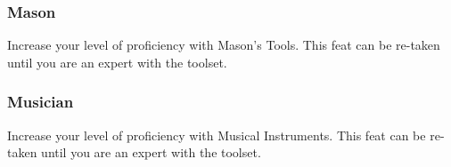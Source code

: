 \subsubsection{Mason} \label{feat::mason}
    Increase your level of proficiency with Mason's Tools.
    This feat can be re-taken until you are an expert with the toolset.

\subsubsection{Musician} \label{feat::musician}
    Increase your level of proficiency with Musical Instruments.
    This feat can be re-taken until you are an expert with the toolset.

